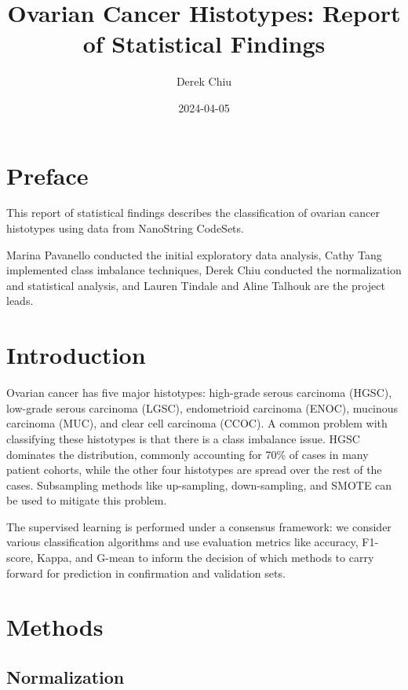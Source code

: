 \documentclass[
]{report}
\title{Ovarian Cancer Histotypes: Report of Statistical Findings}
\author{Derek Chiu}
\date{2024-04-05}
\begin{document}
\maketitle

{
\hypersetup{linkcolor=}
\setcounter{tocdepth}{1}
\tableofcontents
}
\listoffigures
\listoftables
\hypertarget{preface}{%
\chapter*{Preface}\label{preface}}

This report of statistical findings describes the classification of ovarian cancer histotypes using data from NanoString CodeSets.

Marina Pavanello conducted the initial exploratory data analysis, Cathy Tang implemented class imbalance techniques, Derek Chiu conducted the normalization and statistical analysis, and Lauren Tindale and Aline Talhouk are the project leads.

\hypertarget{introduction}{%
\chapter{Introduction}\label{introduction}}

Ovarian cancer has five major histotypes: high-grade serous carcinoma (HGSC), low-grade serous carcinoma (LGSC), endometrioid carcinoma (ENOC), mucinous carcinoma (MUC), and clear cell carcinoma (CCOC). A common problem with classifying these histotypes is that there is a class imbalance issue. HGSC dominates the distribution, commonly accounting for 70\% of cases in many patient cohorts, while the other four histotypes are spread over the rest of the cases. Subsampling methods like up-sampling, down-sampling, and SMOTE can be used to mitigate this problem.

The supervised learning is performed under a consensus framework: we consider various classification algorithms and use evaluation metrics like accuracy, F1-score, Kappa, and G-mean to inform the decision of which methods to carry forward for prediction in confirmation and validation sets.

\hypertarget{methods}{%
\chapter{Methods}\label{methods}}

\hypertarget{normalization}{%
\section{Normalization}\label{normalization}}
\end{document}
